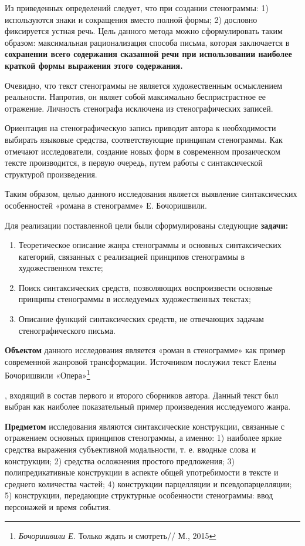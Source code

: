 \documentclass{kursa4}
\begin{document}
    Из приведенных определений следует, что при создании стенограммы: 1) используются знаки и сокращения вместо полной формы; 2) дословно фиксируется устная речь. Цель данного метода можно сформулировать таким образом: максимальная рационализация способа письма, которая заключается в \textbf{сохранении всего содержания сказанной речи при использовании наиболее краткой формы выражения этого содержания.} 

    Очевидно, что текст стенограммы не является художественным осмыслением реальности. Напротив, он являет собой максимально беспристрастное ее отражение. Личность стенографа исключена из стенографических записей. 

    Ориентация на стенографическую запись приводит автора к необходимости выбирать языковые средства, соответствующие принципам стенограммы. Как отмечают исследователи, создание новых форм в современном прозаическом тексте производится, в первую очередь, путем работы с синтаксической структурой произведения. 

    

    {Таким образом, целью данного исследования является выявление синтаксических особенностей «романа в стенограмме» Е. Бочоришвили.}

        {Для реализации поставленной цели были сформулированы следующие \textbf{задачи:}
    
    \begin{enumerate}
      \item Теоретическое описание жанра стенограммы и основных синтаксических категорий, связанных с реализацией принципов стенограммы в художественном тексте; \item Поиск синтаксических средств, позволяющих воспроизвести основные принципы стенограммы в исследуемых художественных текстах; \item Описание функций синтаксических средств, не отвечающих задачам стенографического письма. \end{enumerate}

    \textbf{Объектом} данного исследования является «роман в стенограмме» как пример современной жанровой трансформации. Источником послужил текст Елены Бочоришвили «Опера»\footnote{\textit{Бочоришвили Е.} Только ждать и смотреть// М., 2015}}, входящий в состав первого и второго сборников автора. Данный текст был выбран как наиболее показательный пример произведения исследуемого жанра. 

    \textbf{Предметом} исследования являются синтаксические конструкции, связанные с отражением основных принципов стенограммы, а именно: 1) наиболее яркие средства выражения субъективной модальности, т. е. вводные слова и конструкции; 2) средства осложнения простого предложения; 3)  полипредикативные конструкции в аспекте общей употребимости в тексте и среднего количества частей; 4) конструкции парцелляции и псевдопарцелляции; 5) конструкции, передающие структурные особенности стенограммы: ввод персонажей и время события. 
\end{document}
